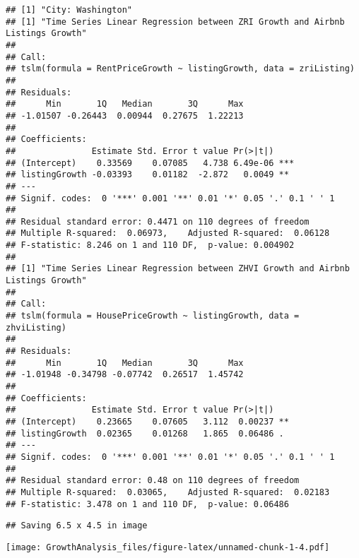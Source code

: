 \documentclass[
]{article}
\begin{document}
\begin{verbatim}
## [1] "City: Washington"
## [1] "Time Series Linear Regression between ZRI Growth and Airbnb Listings Growth"
## 
## Call:
## tslm(formula = RentPriceGrowth ~ listingGrowth, data = zriListing)
## 
## Residuals:
##      Min       1Q   Median       3Q      Max 
## -1.01507 -0.26443  0.00944  0.27675  1.22213 
## 
## Coefficients:
##               Estimate Std. Error t value Pr(>|t|)    
## (Intercept)    0.33569    0.07085   4.738 6.49e-06 ***
## listingGrowth -0.03393    0.01182  -2.872   0.0049 ** 
## ---
## Signif. codes:  0 '***' 0.001 '**' 0.01 '*' 0.05 '.' 0.1 ' ' 1
## 
## Residual standard error: 0.4471 on 110 degrees of freedom
## Multiple R-squared:  0.06973,    Adjusted R-squared:  0.06128 
## F-statistic: 8.246 on 1 and 110 DF,  p-value: 0.004902
## 
## [1] "Time Series Linear Regression between ZHVI Growth and Airbnb Listings Growth"
## 
## Call:
## tslm(formula = HousePriceGrowth ~ listingGrowth, data = zhviListing)
## 
## Residuals:
##      Min       1Q   Median       3Q      Max 
## -1.01948 -0.34798 -0.07742  0.26517  1.45742 
## 
## Coefficients:
##               Estimate Std. Error t value Pr(>|t|)   
## (Intercept)    0.23665    0.07605   3.112  0.00237 **
## listingGrowth  0.02365    0.01268   1.865  0.06486 . 
## ---
## Signif. codes:  0 '***' 0.001 '**' 0.01 '*' 0.05 '.' 0.1 ' ' 1
## 
## Residual standard error: 0.48 on 110 degrees of freedom
## Multiple R-squared:  0.03065,    Adjusted R-squared:  0.02183 
## F-statistic: 3.478 on 1 and 110 DF,  p-value: 0.06486
\end{verbatim}

\begin{verbatim}
## Saving 6.5 x 4.5 in image
\end{verbatim}

\texttt{[image: GrowthAnalysis\_files/figure-latex/unnamed-chunk-1-4.pdf]}
\end{document}
